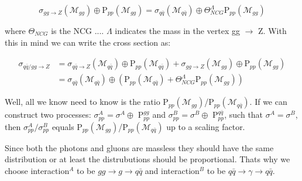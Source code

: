 \begin{equation}
\sigma_{gg\rightarrow Z} (\mathcal{M}_{gg}) \oplus \textrm{P}_{pp}(\mathcal{M}_{gg})=\sigma_{q \bar q}(\mathcal{M}_{q \bar q}) \oplus \Theta_{NCG}^{\Lambda}\textrm{P}_{pp}(\mathcal{M}_{gg})
\end{equation}

where $\Theta_{NCG}$ is the NCG .... $\Lambda$ indicates the mass in the vertex gg $\rightarrow$ Z. With this in mind we can write the cross section as:

\begin{align}
\sigma_{q \bar q/gg \rightarrow Z} &= \sigma_{q \bar q \rightarrow Z} (\mathcal{M}_{q \bar q}) \oplus \textrm{P}_{pp}(\mathcal{M}_{q \bar q})+ \sigma_{gg\rightarrow Z} (\mathcal{M}_{gg}) \oplus \textrm{P}_{pp}(\mathcal{M}_{gg})\nonumber \\ 
&= \sigma_{q \bar q}(\mathcal{M}_{q \bar q}) \oplus (\textrm{P}_{pp}(\mathcal{M}_{q \bar q})+\Theta_{NCG}^{\Lambda}\textrm{P}_{pp}(\mathcal{M}_{gg}))
\end{align}

Well, all we know need to know is the ratio P$_{pp}(\mathcal{M}_{gg})$/P$_{pp}(\mathcal{M}_{q \bar q})$. If we can construct two processes: $\sigma_{pp}^{A}=\sigma^{A} \oplus$ P$_{pp}^{gg}$ and $\sigma_{pp}^{B}=\sigma^{B} \oplus$ P$_{pp}^{q \bar q}$, such that $\sigma^{A}=\sigma^{B}$, then $\sigma_{pp}^{A}/\sigma_{pp}^{B}$ equals  P$_{pp}(\mathcal{M}_{gg})$/P$_{pp}(\mathcal{M}_{q \bar q})$ up to a scaling factor.

Since both the photons and gluons are massless they should have the same distribution or at least the distrubutions should be proportional. Thats why we choose interaction$^{A}$ to be $gg \rightarrow g \rightarrow q \bar q$ and interaction$^{B}$ to be $q \bar q \rightarrow \gamma \rightarrow q \bar q$.



